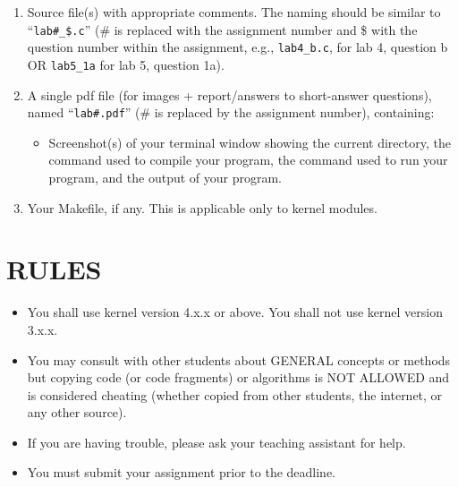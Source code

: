 \documentclass{article}
\begin{document}
\begin{enumerate}
    \item Source file(s) with appropriate comments. The naming should be similar to “\texttt{lab\#\_\$.c}” (\# is replaced with the assignment number and \$ with the question number within the assignment, e.g., \texttt{lab4\_b.c}, for lab 4, question b OR \texttt{lab5\_1a} for lab 5, question 1a).
    \item A single pdf file (for images + report/answers to short-answer questions), named “\texttt{lab\#.pdf}” (\# is replaced by the assignment number), containing:
    \begin{itemize}
        \item Screenshot(s) of your terminal window showing the current directory, the command used to compile your program, the command used to run your program, and the output of your program.
    \end{itemize}
    \item Your Makefile, if any. This is applicable only to kernel modules.
\end{enumerate}

\section*{RULES}

\begin{itemize}
    \item You shall use kernel version 4.x.x or above. You shall not use kernel version 3.x.x.
    \item You may consult with other students about GENERAL concepts or methods but copying code (or code fragments) or algorithms is NOT ALLOWED and is considered cheating (whether copied from other students, the internet, or any other source).
    \item If you are having trouble, please ask your teaching assistant for help.
    \item You must submit your assignment prior to the deadline.
\end{itemize}
\end{document}
